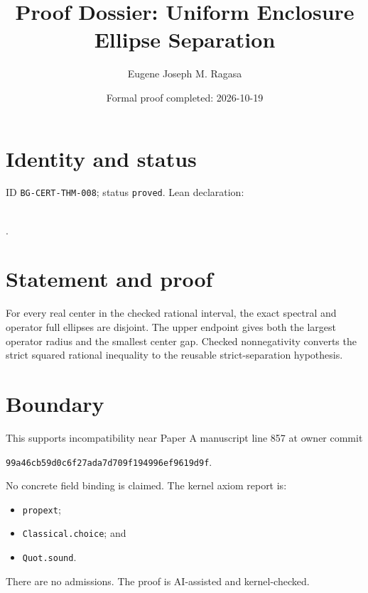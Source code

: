 \documentclass[11pt]{article}
\title{Proof Dossier: Uniform Enclosure Ellipse Separation}\author{Eugene Joseph M. Ragasa}\date{Formal proof completed: 2026-10-19}
\begin{document}
\maketitle
\section{Identity and status}
ID \texttt{BG-CERT-THM-008}; status \texttt{proved}. Lean declaration:
\par{}\\
{\tiny{}}.
\section{Statement and proof}
For every real center in the checked rational interval, the exact spectral and operator
full ellipses are disjoint. The upper endpoint gives both the largest operator radius and
the smallest center gap. Checked nonnegativity converts the strict squared rational
inequality to the reusable strict-separation hypothesis.
\section{Boundary}
This supports incompatibility near Paper A manuscript line 857 at owner commit
\begin{center}\small\texttt{99a46cb59d0c6f27ada7d709f194996ef9619d9f}.\end{center}
No concrete field binding is claimed. The kernel axiom report is:
\begin{itemize}
\item \texttt{propext};
\item \texttt{Classical.choice}; and
\item \texttt{Quot.sound}.
\end{itemize}
There are no admissions. The proof is AI-assisted and kernel-checked.
\end{document}

